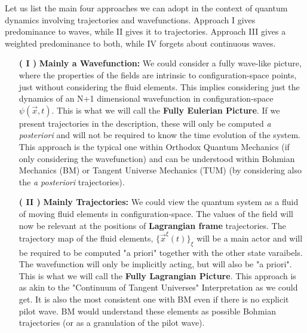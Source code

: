 \documentclass[11pt, a4paper]{article} %
\begin{document}
Let us list the main four approaches we can adopt in the context of quantum dynamics involving trajectories and wavefunctions. Approach I gives predominance to waves, while II gives it to trajectories. Approach III gives a weighted predominance to both, while IV forgets about continuous waves.
\vspace{-0.1cm}
\begin{enumerate}
\item[\bf ( I )] {\bf Mainly a Wavefunction: } We could consider a fully wave-like picture, where the properties of the fields are intrinsic to configuration-space points, just without considering the fluid elements. This implies considering just the dynamics of an N+1 dimensional wavefunction in configuration-space $\psi(\vec{x},t)$. This is what we will call the {\bf Fully Eulerian Picture}. If we present trajectories in the description, these will only be computed {\em a posteriori} and will not be required to know the time evolution of the system. This approach is the typical one within Orthodox Quantum Mechanics (if only considering the wavefunction) and can be understood within Bohmian Mechanics (BM) or Tangent Universe Mechanics (TUM) (by considering also the {\em a posteriori} trajectories).


\item[\bf ( II )]{\bf Mainly Trajectories:} We could view the quantum system as a fluid of moving fluid elements in configuration-space. The values of the field will now be relevant at the positions of {\bf Lagrangian frame} trajectories. The trajectory map of the fluid elements, $\{\vec{x}^\xi(t)\}_\xi$ will be a main actor and will be required to be computed "a priori" together with the other state varaibels. The wavefunction will only be implicitly acting, but will also be "a priori". This is what we will call the {\bf Fully Lagrangian Picture}. This approach is as akin to the "Continuum of Tangent Universes" Interpretation as we could get. It is also the most consistent one with BM even if there is no explicit pilot wave. BM would understand these elements as possible Bohmian trajectories (or as a granulation of the pilot wave).


\end{enumerate}
\end{document}
